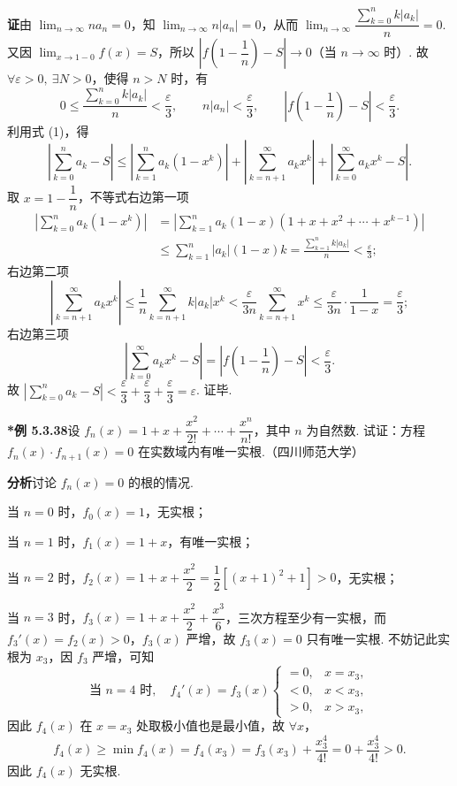 \documentclass[UTF8,12pt,a4paper,fontset=fandol]{ctexart}
\begin{document}
\noindent\textbf{证}\quad 由 $\displaystyle\lim_{n\to\infty}na_n=0$，知
$\displaystyle\lim_{n\to\infty}n|a_n|=0$，从而
$\displaystyle\lim_{n\to\infty}\dfrac{\sum_{k=0}^n k|a_k|}{n}=0$. 又因
$\displaystyle\lim_{x\to1-0}f(x)=S$，所以
$\left|f\left(1-\dfrac1n\right)-S\right|\to0$（当 $n\to\infty$ 时）. 故
$\forall\varepsilon>0,\ \exists N>0$，使得 $n>N$ 时，有
\[
  0\le\frac{\sum_{k=0}^n k|a_k|}{n}<\frac\varepsilon3,\qquad
  n|a_n|<\frac\varepsilon3,\qquad
  \left|f\left(1-\frac1n\right)-S\right|<\frac\varepsilon3.
\]
利用式 (1)，得
\[
  \left|\sum_{k=0}^n a_k-S\right|
  \le\left|\sum_{k=1}^n a_k(1-x^k)\right|
  +\left|\sum_{k=n+1}^{\infty}a_kx^k\right|
  +\left|\sum_{k=0}^{\infty}a_kx^k-S\right|.
\]
取 $x=1-\dfrac1n$，不等式右边第一项
\[
\begin{aligned}
\left|\sum_{k=0}^n a_k(1-x^k)\right|
&=\left|\sum_{k=1}^n a_k(1-x)(1+x+x^2+\cdots+x^{k-1})\right|\\
&\le\sum_{k=1}^n |a_k|(1-x)k
=\frac{\sum_{k=1}^n k|a_k|}{n}<\frac\varepsilon3;
\end{aligned}
\]
右边第二项
\[
  \left|\sum_{k=n+1}^{\infty}a_kx^k\right|
  \le\frac1n\sum_{k=n+1}^{\infty}k|a_k|x^k
  <\frac\varepsilon{3n}\sum_{k=n+1}^{\infty}x^k
  \le\frac\varepsilon{3n}\cdot\frac1{1-x}
  =\frac\varepsilon3;
\]
右边第三项
\[
  \left|\sum_{k=0}^{\infty}a_kx^k-S\right|
  =\left|f\left(1-\frac1n\right)-S\right|<\frac\varepsilon3.
\]
故 $\left|\displaystyle\sum_{k=0}^n a_k-S\right|<\dfrac\varepsilon3+\dfrac\varepsilon3+\dfrac\varepsilon3=\varepsilon$. 证毕.

\noindent\textbf{*例 5.3.38}\quad 设
$f_n(x)=1+x+\dfrac{x^2}{2!}+\cdots+\dfrac{x^n}{n!}$，其中 $n$ 为自然数. 试证：方程
$f_n(x)\cdot f_{n+1}(x)=0$ 在实数域内有唯一实根.（四川师范大学）

\noindent\textbf{分析}\quad 讨论 $f_n(x)=0$ 的根的情况.

当 $n=0$ 时，$f_0(x)=1$，无实根；

当 $n=1$ 时，$f_1(x)=1+x$，有唯一实根；

当 $n=2$ 时，$f_2(x)=1+x+\dfrac{x^2}{2}=\dfrac12[(x+1)^2+1]>0$，无实根；

当 $n=3$ 时，$f_3(x)=1+x+\dfrac{x^2}{2}+\dfrac{x^3}{6}$，三次方程至少有一实根，而
$f_3'(x)=f_2(x)>0$，$f_3(x)$ 严增，故 $f_3(x)=0$ 只有唯一实根. 不妨记此实根为 $x_3$，因 $f_3$ 严增，可知
\[
  \text{当 }n=4\text{ 时},\quad
  f_4'(x)=f_3(x)
  \begin{cases}
    =0,&x=x_3,\\
    <0,&x<x_3,\\
    >0,&x>x_3,
  \end{cases}
\]
因此 $f_4(x)$ 在 $x=x_3$ 处取极小值也是最小值，故 $\forall x$，
\[
  f_4(x)\ge\min f_4(x)=f_4(x_3)=f_3(x_3)+\frac{x_3^4}{4!}=0+\frac{x_3^4}{4!}>0.
\]
因此 $f_4(x)$ 无实根.
\end{document}
